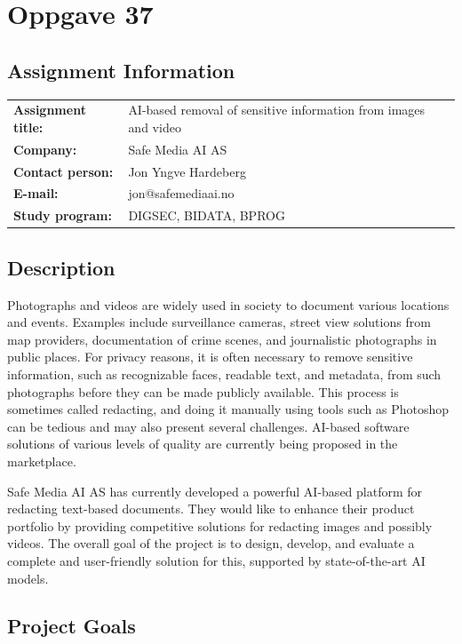 \chapter{Oppgave 37}
\label{app:oppgave37}

\section*{Assignment Information}

\begin{tabular}{@{}ll@{}}
\textbf{Assignment title:} & AI-based removal of sensitive information from images and video \\
\textbf{Company:} & Safe Media AI AS \\
\textbf{Contact person:} & Jon Yngve Hardeberg \\
\textbf{E-mail:} & jon@safemediaai.no \\
\textbf{Study program:} & DIGSEC, BIDATA, BPROG \\
\end{tabular}

\section*{Description}

Photographs and videos are widely used in society to document various locations and events. Examples include surveillance cameras, street view solutions from map providers, documentation of crime scenes, and journalistic photographs in public places. For privacy reasons, it is often necessary to remove sensitive information, such as recognizable faces, readable text, and metadata, from such photographs before they can be made publicly available. This process is sometimes called redacting, and doing it manually using tools such as Photoshop can be tedious and may also present several challenges. AI-based software solutions of various levels of quality are currently being proposed in the marketplace.

Safe Media AI AS has currently developed a powerful AI-based platform for redacting text-based documents. They would like to enhance their product portfolio by providing competitive solutions for redacting images and possibly videos. The overall goal of the project is to design, develop, and evaluate a complete and user-friendly solution for this, supported by state-of-the-art AI models.

\section*{Project Goals}

